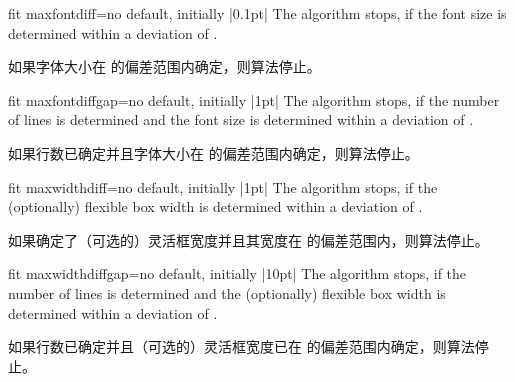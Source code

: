 %  

% 
% 

% 





\begin{docTcbKey}{fit maxfontdiff}{=}{no default, initially |0.1pt|}
The algorithm stops, if the font size is determined within a deviation of
.

如果字体大小在  的偏差范围内确定，则算法停止。
\end{docTcbKey}


\begin{docTcbKey}{fit maxfontdiffgap}{=}{no default, initially |1pt|}
The algorithm stops, if the number of lines is determined and the font size is
determined within a deviation of .

如果行数已确定并且字体大小在  的偏差范围内确定，则算法停止。
\end{docTcbKey}


\begin{docTcbKey}{fit maxwidthdiff}{=}{no default, initially |1pt|}
The algorithm stops, if the (optionally) flexible box width
is determined within a deviation of .

如果确定了（可选的）灵活框宽度并且其宽度在  的偏差范围内，则算法停止。
\end{docTcbKey}


\begin{docTcbKey}{fit maxwidthdiffgap}{=}{no default, initially |10pt|}
The algorithm stops, if the number of lines is determined and the (optionally) flexible box width
is determined within a deviation of .

如果行数已确定并且（可选的）灵活框宽度已在  的偏差范围内确定，则算法停止。
\end{docTcbKey}


